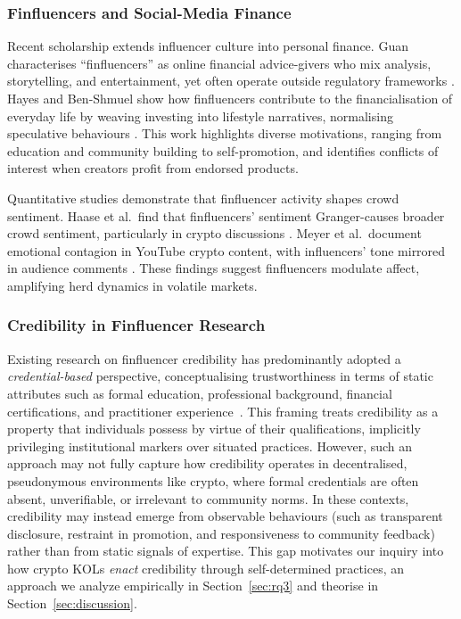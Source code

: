\subsubsection{Finfluencers and Social-Media Finance}

Recent scholarship extends influencer culture into personal finance. Guan characterises ``finfluencers'' as online financial advice-givers who mix analysis, storytelling, and entertainment, yet often operate outside regulatory frameworks \cite{GuanFinfluencer2023}. Hayes and Ben-Shmuel show how finfluencers contribute to the financialisation of everyday life by weaving investing into lifestyle narratives, normalising speculative behaviours \cite{HayesFinfluence2024}. This work highlights diverse motivations, ranging from education and community building to self-promotion, and identifies conflicts of interest when creators profit from endorsed products.

Quantitative studies demonstrate that finfluencer activity shapes crowd sentiment. Haase et al.\ find that finfluencers' sentiment Granger-causes broader crowd sentiment, particularly in crypto discussions \cite{HaaseFinfluencersSentiment2025}. Meyer et al.\ document emotional contagion in YouTube crypto content, with influencers' tone mirrored in audience comments \cite{MeyerHighOnBitcoin2023}. These findings suggest finfluencers modulate affect, amplifying herd dynamics in volatile markets.

\subsubsection{Credibility in Finfluencer Research}

Existing research on finfluencer credibility has predominantly adopted a \emph{credential-based} perspective, conceptualising trustworthiness in terms of static attributes such as formal education, professional background, financial certifications, and practitioner experience~\cite{NurhandayaniWhoDeserves2025}. This framing treats credibility as a property that individuals possess by virtue of their qualifications, implicitly privileging institutional markers over situated practices. However, such an approach may not fully capture how credibility operates in decentralised, pseudonymous environments like crypto, where formal credentials are often absent, unverifiable, or irrelevant to community norms. In these contexts, credibility may instead emerge from observable behaviours (such as transparent disclosure, restraint in promotion, and responsiveness to community feedback) rather than from static signals of expertise. This gap motivates our inquiry into how crypto KOLs \emph{enact} credibility through self-determined practices, an approach we analyze empirically in Section~\ref{sec:rq3} and theorise in Section~\ref{sec:discussion}.

